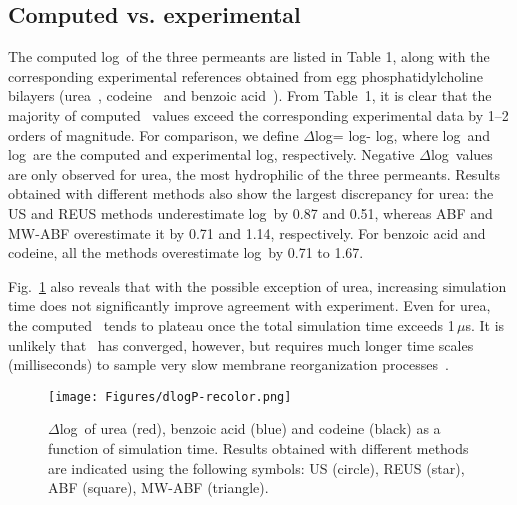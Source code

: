 
\subsection{Computed vs. experimental \perm}
  \par The computed log\perm~of the three permeants are listed in Table 1, along with the corresponding experimental references obtained from egg phosphatidylcholine bilayers (urea~\cite{Gallucci1971}, codeine~\cite{Orbach1980} and  benzoic acid~\cite{Walter1984}).
  From Table~1, it is clear that the majority of computed \perm~values exceed the corresponding experimental data by 1--2 orders of magnitude. For comparison, we define $\Delta$log\perm = log\permcom - log\permexp, where log\permcom~and log\permexp~are the computed and experimental log\perm, respectively. Negative $\Delta$log\perm~values are only observed for urea, the most hydrophilic of the three permeants.  Results obtained with different methods also show the largest discrepancy for urea: the US and REUS  methods underestimate log\perm~by 0.87 and 0.51, whereas ABF and MW-ABF overestimate it by 0.71 and 1.14, respectively. For benzoic acid and codeine, all the methods overestimate log\perm~by 0.71 to 1.67.

  

  Fig.~\ref{fig:deltaP} also reveals that with the possible exception of urea, increasing simulation time does not significantly improve agreement with experiment.  Even for urea, the computed \perm~tends to plateau once the total simulation time exceeds 1\,$\mu$s.  It is unlikely that \perm~has converged, however, but requires much longer time scales (milliseconds) to sample very slow membrane reorganization processes~\cite{Neale2011}.


  \begin{figure}
    \centering
    \texttt{[image: Figures/dlogP-recolor.png]}
    \caption{ $\Delta$log\perm~of urea (red), benzoic acid (blue) and codeine (black) as a function of simulation time. %
    Results obtained with different methods are indicated using the following symbols: US (circle), REUS (star), ABF (square), MW-ABF (triangle). }
    \label{fig:deltaP}
  \end{figure}
